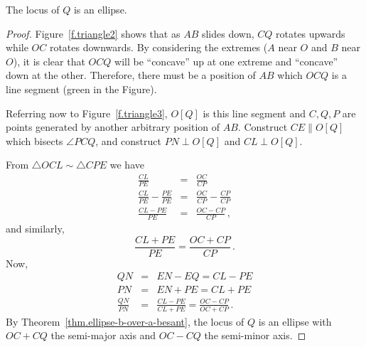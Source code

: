
\begin{theorem}
The locus of $Q$ is an ellipse.
\end{theorem}

\begin{proof}
Figure~\ref{f.triangle2} shows that as $AB$ slides down, $CQ$ rotates upwards while $OC$ rotates downwards. By considering the extremes ($A$ near $O$ and $B$ near $O$), it is clear that $OCQ$ will be ``concave'' up at one extreme and ``concave'' down at the other. Therefore, there must be a position of $AB$ which $OCQ$ is a line segment (green in the Figure).

Referring now to Figure~\ref{f.triangle3}, $O[Q]$ is this line segment and $C,Q,P$ are points generated by another arbitrary position of $AB$. Construct $CE\parallel O[Q]$ which bisects $\angle PCQ$, and construct $PN\perp O[Q]$ and $CL\perp O[Q]$.

From $\triangle OCL\sim \triangle CPE$ we have
\begin{eqnarray*}
\frac{CL}{PE}&=&\frac{OC}{CP}\\[4pt]
\frac{CL}{PE}-\frac{PE}{PE}&=&\frac{OC}{CP}-\frac{CP}{CP}\\[4pt]
\frac{CL-PE}{PE}&=&\frac{OC-CP}{CP}\,,
\end{eqnarray*}
and similarly,
\[
\frac{CL+PE}{PE}=\frac{OC+CP}{CP}\,.
\]
Now,
\begin{eqnarray*}
QN &=& EN - EQ = CL - PE\\
PN &=& EN + PE = CL + PE\\[4pt]
\frac{QN}{PN}&=& \frac{CL-PE}{CL+PE}=\frac{OC-CP}{OC+CP}\,.
\end{eqnarray*}
By Theorem~\ref{thm.ellipse-b-over-a-besant}, the locus of $Q$ is an ellipse with $OC+CQ$ the semi-major axis and $OC-CQ$ the semi-minor axis.\hqed
\end{proof}



